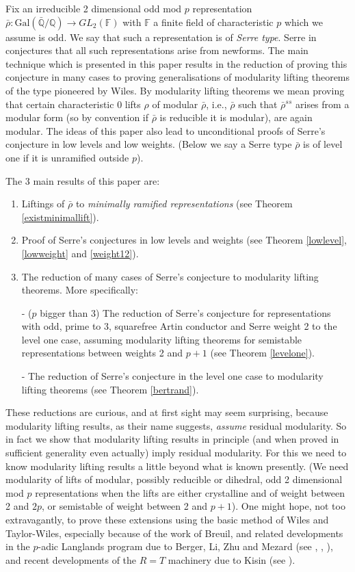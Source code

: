 \documentclass[12pt]{article}
\newcommand{\rhobar}{\overline{\rho}}
\newcommand{\FF}{ {\mathbb F} }
\def\rhobar{ {\bar {\rho} } }
\def\rhob{ {\bar {\rho} } }
\newcommand{\Galois}{\mathrm{Gal}}
\newcommand{\Gal}{\Galois( \bar{ {\mathbb Q}}/{\mathbb Q})}
\begin{document}
Fix an irreducible 2 dimensional odd mod $p$ representation
$\rhob:\Gal \rightarrow GL_2(\FF)$ with $\FF$ a finite field of
characteristic
$p$ which we assume is odd. We say that such a representation is of {\it
Serre
type}. Serre in
\cite{Serre3} conjectures that all such
representations arise from newforms. The main technique which is presented
in this paper results in the reduction of proving this conjecture in many
cases
to proving generalisations of modularity lifting theorems of the type
pioneered by Wiles. By modularity lifting theorems we mean proving
that certain characteristic 0 lifts $\rho$ of modular $\rhobar$, i.e.,
$\rhobar$
such that $\rhobar^{ss}$ arises from a modular form (so by convention if
$\rhobar$ is reducible it is modular), are again modular.
The ideas of this paper also lead to unconditional proofs of
Serre's conjecture
in low levels and low weights. (Below we say a
Serre type $\rhob$ is of level one if it is unramified outside $p$).

The 3 main results of this paper are:

\begin{enumerate}

\item Liftings of $\rhobar$ to {\it minimally ramified representations} (see
 Theorem \ref{existminimallift}).

\item Proof of Serre's conjectures in low levels and weights (see Theorem
\ref{lowlevel}, \ref{lowweight} and \ref{weight12}).

\item The reduction of many cases of Serre's conjecture to modularity
lifting
theorems. More specifically:

- ($p$ bigger than $3$) The reduction of Serre's conjecture
for representations  with odd, prime to 3, squarefree Artin conductor and
Serre
weight 2
to the level one case, assuming modularity lifting theorems
for semistable representations between weights 2 and $p+1$
(see Theorem \ref{levelone}).

- The reduction of Serre's conjecture in the level one case to modularity
lifting theorems (see Theorem \ref{bertrand}).
\end{enumerate}

These reductions are curious, and at first sight may seem surprising,
because
modularity lifting results, as their name
suggests,  {\it assume} residual modularity.
So in fact we show that modularity lifting results in principle (and when
proved
in sufficient generality even actually) imply residual modularity. For this
we need to know modularity lifting results a little beyond what is
known
presently. (We need modularity of lifts of modular, possibly reducible or
dihedral,
odd 2 dimensional mod $p$ representations when the lifts are either
crystalline and of weight between 2 and $2p$, or semistable of weight
between 2
and $p+1$).
One might hope, not too extravagantly, to prove these extensions
using the basic method of Wiles and Taylor-Wiles,
especially because of the work of Breuil, and related developments
in the $p$-adic Langlands program due to Berger, Li, Zhu and Mezard
(see \cite{Breuil},
\cite{BM},
\cite{BLZ}), and  recent developments of the $R=T$ machinery
due to Kisin (see \cite{Kisin}).
\end{document}

